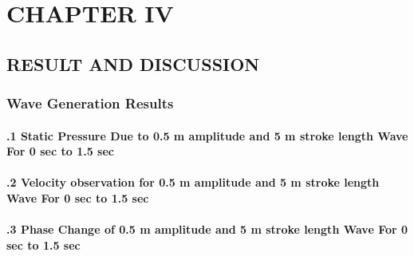 

\setcounter{tocdepth}{4}
\section*{\centering\fontsize{14}{16}\selectfont CHAPTER IV}

\subsection*{\centering\fontsize{12}{14}\selectfont RESULT AND DISCUSSION}

\subsubsection*{\fontsize{10}{12} Wave Generation Results}

\paragraph{\fontsize{10}{12}.1 Static Pressure Due to 0.5 m amplitude and 5 m stroke length Wave For 0 sec to 1.5 sec}


\paragraph{\fontsize{10}{12}.2 Velocity observation for 0.5 m amplitude and 5 m stroke length Wave For 0 sec to 1.5 sec}


\paragraph{\fontsize{10}{12}.3 Phase Change of 0.5 m amplitude and 5 m stroke length Wave For 0 sec to 1.5 sec}

